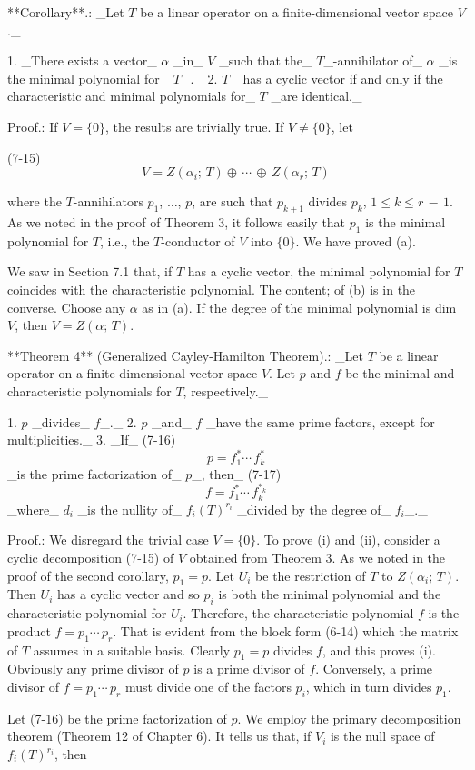 

**Corollary**.: _Let \(T\) be a linear operator on a finite-dimensional vector space \(V\)._

1. _There exists a vector_ \(\alpha\) _in_ \(V\) _such that the_ \(T\)_-annihilator of_ \(\alpha\) _is the minimal polynomial for_ \(T\)_._
2. \(T\) _has a cyclic vector if and only if the characteristic and minimal polynomials for_ \(T\) _are identical._

Proof.: If \(V=\{0\}\), the results are trivially true. If \(V\neq\{0\}\), let

(7-15) \[V=Z(\alpha_{i};\,T)\oplus\,\cdots\,\oplus\,Z(\alpha_{r};\,T)\]

where the \(T\)-annihilators \(p_{1}\), \(\ldots\), \(p\), are such that \(p_{k+1}\) divides \(p_{k}\), \(1\leq k\leq r\,-\,1\). As we noted in the proof of Theorem 3, it follows easily that \(p_{1}\) is the minimal polynomial for \(T\), i.e., the \(T\)-conductor of \(V\) into \(\{0\}\). We have proved (a).

We saw in Section 7.1 that, if \(T\) has a cyclic vector, the minimal polynomial for \(T\) coincides with the characteristic polynomial. The content; of (b) is in the converse. Choose any \(\alpha\) as in (a). If the degree of the minimal polynomial is dim \(V\), then \(V=Z(\alpha;\,T)\). 

**Theorem 4** (Generalized Cayley-Hamilton Theorem).: _Let \(T\) be a linear operator on a finite-dimensional vector space \(V\). Let \(p\) and \(f\) be the minimal and characteristic polynomials for \(T\), respectively._

1. \(p\) _divides_ \(f\)_._
2. \(p\) _and_ \(f\) _have the same prime factors, except for multiplicities._
3. _If_ (7-16) \[p=f_{1}^{*}\cdots\,f_{k}^{*}\] _is the prime factorization of_ \(p\)_, then_ (7-17) \[f=f_{1}^{*}\cdots\,f_{k}^{*_{k}}\] _where_ \(d_{i}\) _is the nullity of_ \(f_{i}(T)^{r_{i}}\) _divided by the degree of_ \(f_{i}\)_._

Proof.: We disregard the trivial case \(V=\{0\}\). To prove (i) and (ii), consider a cyclic decomposition (7-15) of \(V\) obtained from Theorem 3. As we noted in the proof of the second corollary, \(p_{1}=p\). Let \(U_{i}\) be the restriction of \(T\) to \(Z(\alpha_{i};\,T)\). Then \(U_{i}\) has a cyclic vector and so \(p_{i}\) is both the minimal polynomial and the characteristic polynomial for \(U_{i}\). Therefore, the characteristic polynomial \(f\) is the product \(f=p_{1}\cdots\,p_{r}\). That is evident from the block form (6-14) which the matrix of \(T\) assumes in a suitable basis. Clearly \(p_{1}=p\) divides \(f\), and this proves (i). Obviously any prime divisor of \(p\) is a prime divisor of \(f\). Conversely, a prime divisor of \(f=p_{1}\cdots\,p_{r}\) must divide one of the factors \(p_{i}\), which in turn divides \(p_{1}\).

Let (7-16) be the prime factorization of \(p\). We employ the primary decomposition theorem (Theorem 12 of Chapter 6). It tells us that, if \(V_{i}\) is the null space of \(f_{i}(T)^{r_{i}}\), then